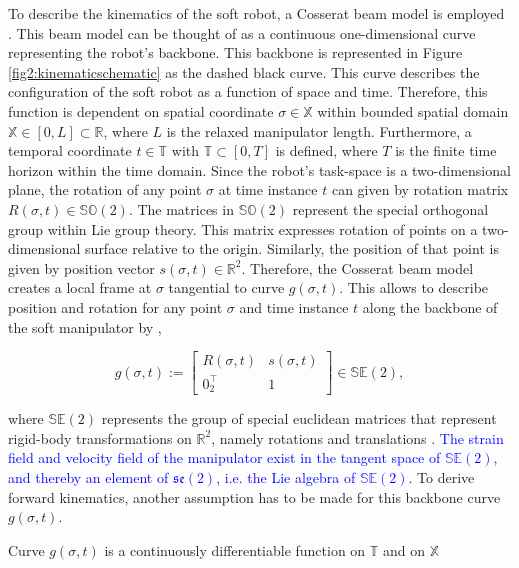 To describe the kinematics of the soft robot, a Cosserat beam model is employed \cite{Boyer2019}. This beam model can be thought of as a continuous one-dimensional curve representing the robot's backbone. This backbone is represented in Figure \ref{fig2:kinematicschematic} as the dashed black curve. This curve describes the configuration of the soft robot as a function of space and time. Therefore, this function is dependent on spatial coordinate $\sigma \in \mathbb{X}$ within bounded spatial domain $\mathbb{X} \in [0,L] \subset \mathbb{R}$, where $L$ is the relaxed manipulator length. Furthermore, a temporal coordinate $t \in \mathbb{T}$ with $\mathbb{T} \subset [0,T]$ is defined, where $T$ is the finite time horizon within the time domain. Since the robot's task-space is a two-dimensional plane, the rotation of any point $\sigma$ at time instance $t$ can given by rotation matrix $R(\sigma,t) \in \mathbb{SO}(2)$. The matrices in $\mathbb{SO}(2)$ represent the special orthogonal group within Lie group theory. This matrix expresses rotation of points on a two-dimensional surface relative to the origin. Similarly, the position of that point is given by position vector $s(\sigma,t) \in \mathbb{R}^2$. Therefore, the Cosserat beam model creates a local frame at $\sigma$ tangential to curve $g(\sigma,t)$. This allows to describe position and rotation for any point $\sigma$ and time instance $t$ along the backbone of the soft manipulator by \cite{Caasenbrood2020},


\begin{equation}
    g(\sigma,t) := \begin{bmatrix}  R(\sigma,t) & s(\sigma,t) \\ 0_2^\top & 1 \end{bmatrix} \in \mathbb{SE}(2),
    \label{eq2:g}
\end{equation}

where $\mathbb{SE}(2)$ represents the group of special euclidean matrices that represent rigid-body transformations on $\mathbb{R}^2$, namely rotations and translations \cite{Sola2018}. \textcolor{blue}{The strain field and velocity field of the manipulator exist in the tangent space of $\mathbb{SE}(2)$, and thereby an element of $\mathfrak{se}(2)$, i.e. the Lie algebra of $\mathbb{SE}(2)$.} To derive forward kinematics, another assumption has to be made for this backbone curve $g(\sigma,t)$.

\begin{theorem}
Curve  $g(\sigma,t)$ is a continuously differentiable function on $\mathbb{T}$ and on $\mathbb{X}$
\end{theorem}

